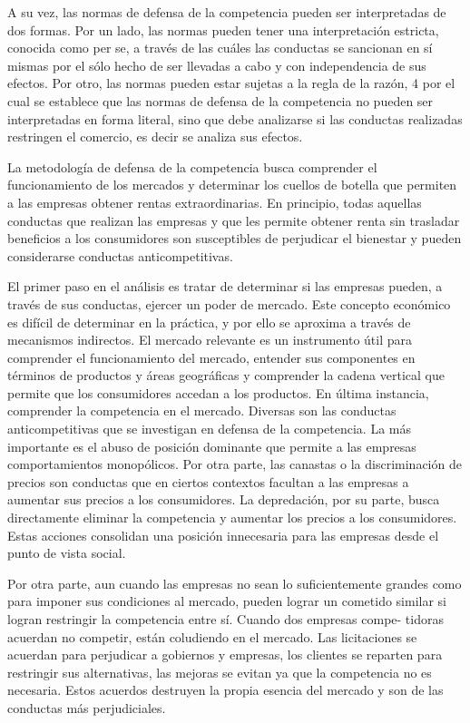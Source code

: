 \documentclass[
  12pt,
  spanish,
]{book}
\begin{document}
A su vez, las normas de defensa de la competencia pueden ser interpretadas de dos formas. Por un lado, las normas pueden tener una interpretación estricta, conocida como per se, a través de las cuáles las conductas se sancionan en sí mismas por el sólo hecho de ser llevadas a cabo y con independencia de sus efectos. Por otro, las normas pueden estar sujetas a la regla de la razón, 4 por el cual se establece que las normas de defensa de la competencia no pueden ser interpretadas en forma literal, sino que debe analizarse si las conductas realizadas restringen el comercio, es decir se analiza sus efectos.

La metodología de defensa de la competencia busca comprender el funcionamiento de los mercados y determinar los cuellos de botella que permiten a las empresas obtener rentas extraordinarias. En principio, todas aquellas conductas que realizan las empresas y que les permite obtener renta sin trasladar beneficios a los consumidores son susceptibles de perjudicar el bienestar y pueden considerarse conductas anticompetitivas.

El primer paso en el análisis es tratar de determinar si las empresas pueden, a través de sus conductas, ejercer un poder de mercado. Este concepto económico es difícil de determinar en la práctica, y por ello se aproxima a través de mecanismos indirectos. El mercado relevante es un instrumento útil para comprender el funcionamiento del mercado, entender sus componentes en términos de productos y áreas geográficas y comprender la cadena vertical que permite que los consumidores accedan a los productos. En última instancia, comprender la competencia en el mercado.
Diversas son las conductas anticompetitivas que se investigan en defensa de la competencia. La más importante es el abuso de posición dominante que permite a las empresas comportamientos monopólicos. Por otra parte, las canastas o la discriminación de precios son conductas que en ciertos contextos facultan a las empresas a aumentar sus precios a los consumidores. La depredación, por su parte, busca directamente eliminar la competencia y aumentar los precios a los consumidores. Estas acciones consolidan una posición innecesaria para las empresas desde el punto de vista social.

Por otra parte, aun cuando las empresas no sean lo suficientemente grandes como para imponer sus condiciones al mercado, pueden lograr un cometido similar si logran restringir la competencia entre sí. Cuando dos empresas compe-
tidoras acuerdan no competir, están coludiendo en el mercado. Las licitaciones se acuerdan para perjudicar a gobiernos y empresas, los clientes se reparten para restringir sus alternativas, las mejoras se evitan ya que la competencia no es necesaria. Estos acuerdos destruyen la propia esencia del mercado y son de las conductas más perjudiciales.
\end{document}
